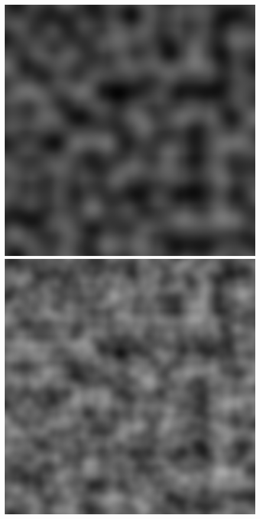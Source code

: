 \documentclass{EPUProjetDi}
\begin{document}
\begin{figure}[ht]
	\centering
	\includegraphics[scale=.3]{perlin_1_octave}
	\includegraphics[scale=.3]{perlin_2_octaves}

\end{figure}
\end{document}
